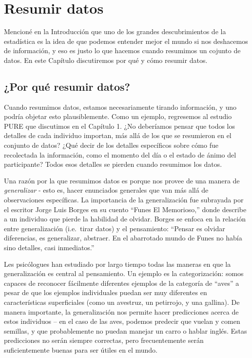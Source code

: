 \documentclass[
  12pt,
]{book}
\begin{document}
\hypertarget{summarizing-data}{%
\chapter{Resumir datos}\label{summarizing-data}}

Mencioné en la Introducción que uno de los grandes descubrimientos de la estadística es la idea de que podemos entender mejor el mundo si nos deshacemos de información, y eso es justo lo que hacemos cuando resumimos un cojunto de datos.
En este Capítulo discutiremos por qué y cómo resumir datos.

\hypertarget{por-quuxe9-resumir-datos}{%
\section{¿Por qué resumir datos?}\label{por-quuxe9-resumir-datos}}

Cuando resumimos datos, estamos necesariamente tirando información, y uno podría objetar esto plausiblemente. Como un ejemplo, regresemos al estudio PURE que discutimos en el Capítulo 1. ¿No deberíamos pensar que todos los detalles de cada individuo importan, más allá de los que se resumieron en el conjunto de datos? ¿Qué decir de los detalles específicos sobre cómo fue recolectada la información, como el momento del día o el estado de ánimo del participante? Todos esos detalles se pierden cuando resumimos los datos.

Una razón por la que resumimos datos es porque nos provee de una manera de \emph{generalizar} - esto es, hacer enunciados generales que van más allá de observaciones específicas. La importancia de la generalización fue subrayada por el escritor Jorge Luis Borges en su cuento ``Funes El Memorioso,'' donde describe a un individuo que pierde la habilidad de olvidar. Borges se enfoca en la relación entre generalización (i.e.~tirar datos) y el pensamiento: ``Pensar es olvidar diferencias, es generalizar, abstraer. En el abarrotado mundo de Funes no había sino detalles, casi inmediatos.''

Les psicólogues han estudiado por largo tiempo todas las maneras en que la generalización es central al pensamiento. Un ejemplo es la categorización: somos capaces de reconocer fácilmente diferentes ejemplos de la categoría de ``aves'' a pesar de que los ejemplos individuales puedan ser muy diferentes en características superficiales (como un avestruz, un petirrojo, y una gallina). De manera importante, la generalización nos permite hacer predicciones acerca de estos individuos -- en el caso de las aves, podemos predecir que vuelan y comen semillas, y que probablemente no puedan manejar un carro o hablar inglés. Estas predicciones no serán siempre correctas, pero frecuentemente serán suficientemente buenas para ser útiles en el mundo.
\end{document}
